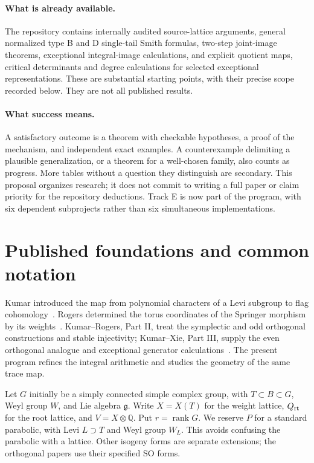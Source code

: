 \documentclass[11pt,letterpaper]{article}
\newcommand{\Q}{\mathbb Q}
\begin{document}
\paragraph{What is already available.}
The repository contains internally audited source-lattice arguments, general
normalized type B and D single-tail Smith formulas, two-step joint-image
theorems, exceptional integral-image calculations, and explicit quotient maps,
critical determinants and degree calculations for selected exceptional
representations. These are substantial starting points, with their precise
scope recorded below. They are not all published results.

\paragraph{What success means.}
A satisfactory outcome is a theorem with checkable hypotheses, a proof of the
mechanism, and independent exact examples. A counterexample delimiting a
plausible generalization, or a theorem for a well-chosen family, also counts
as progress. More tables without a question they distinguish are secondary.
This proposal organizes research; it does not commit to writing a full paper
or claim priority for the repository deductions.
Track E is now part of the program, with six dependent subprojects rather
than six simultaneous implementations.

\newpage
\section{Published foundations and common notation}
Kumar introduced the map from polynomial characters of a Levi subgroup to
flag cohomology~\cite{K}. Rogers determined the torus coordinates of the
Springer morphism by its weights~\cite{R}. Kumar--Rogers, Part II, treat
the symplectic and odd orthogonal constructions and stable injectivity;
Kumar--Xie, Part III, supply the even orthogonal analogue and exceptional
generator calculations~\cite{KR,KX}. The present program refines the
integral arithmetic and studies the geometry of the same trace map.

Let \(G\) initially be a simply connected simple complex group, with
\(T\subset B\subset G\), Weyl group \(W\), and Lie algebra
\(\mathfrak g\). Write \(X=X(T)\) for the weight lattice, \(Q_{\rm rt}\)
for the root lattice, and \(V=X\otimes\Q\). Put \(r=\operatorname{rank}G\).
We reserve \(P\) for a standard parabolic, with Levi \(L\supset T\)
and Weyl group \(W_L\). This avoids confusing the parabolic with a lattice.
Other isogeny forms are separate extensions; the orthogonal papers use their
specified \(\mathrm{SO}\) forms.
\end{document}
